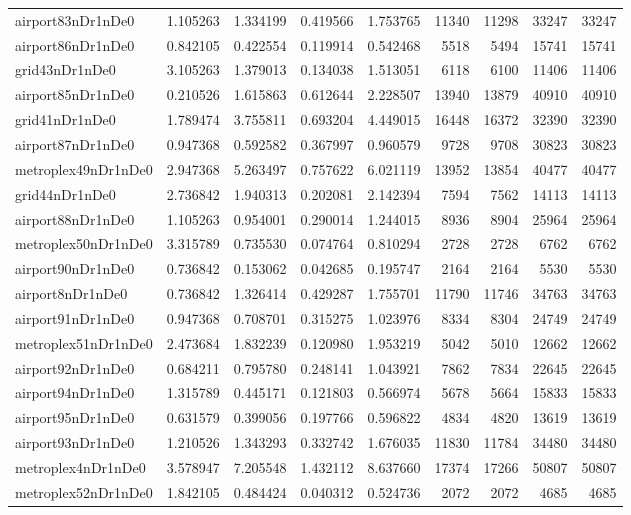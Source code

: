 \begin{longtable}{|l|r|r|r|r|r|r|r|r|}
airport83nDr1nDe0 & 1.105263 & 1.334199 & 0.419566 & 1.753765 & 11340 & 11298 & 33247 & 33247 \\
airport86nDr1nDe0 & 0.842105 & 0.422554 & 0.119914 & 0.542468 & 5518 & 5494 & 15741 & 15741 \\
grid43nDr1nDe0 & 3.105263 & 1.379013 & 0.134038 & 1.513051 & 6118 & 6100 & 11406 & 11406 \\
airport85nDr1nDe0 & 0.210526 & 1.615863 & 0.612644 & 2.228507 & 13940 & 13879 & 40910 & 40910 \\
grid41nDr1nDe0 & 1.789474 & 3.755811 & 0.693204 & 4.449015 & 16448 & 16372 & 32390 & 32390 \\
airport87nDr1nDe0 & 0.947368 & 0.592582 & 0.367997 & 0.960579 & 9728 & 9708 & 30823 & 30823 \\
metroplex49nDr1nDe0 & 2.947368 & 5.263497 & 0.757622 & 6.021119 & 13952 & 13854 & 40477 & 40477 \\
grid44nDr1nDe0 & 2.736842 & 1.940313 & 0.202081 & 2.142394 & 7594 & 7562 & 14113 & 14113 \\
airport88nDr1nDe0 & 1.105263 & 0.954001 & 0.290014 & 1.244015 & 8936 & 8904 & 25964 & 25964 \\
metroplex50nDr1nDe0 & 3.315789 & 0.735530 & 0.074764 & 0.810294 & 2728 & 2728 & 6762 & 6762 \\
airport90nDr1nDe0 & 0.736842 & 0.153062 & 0.042685 & 0.195747 & 2164 & 2164 & 5530 & 5530 \\
airport8nDr1nDe0 & 0.736842 & 1.326414 & 0.429287 & 1.755701 & 11790 & 11746 & 34763 & 34763 \\
airport91nDr1nDe0 & 0.947368 & 0.708701 & 0.315275 & 1.023976 & 8334 & 8304 & 24749 & 24749 \\
metroplex51nDr1nDe0 & 2.473684 & 1.832239 & 0.120980 & 1.953219 & 5042 & 5010 & 12662 & 12662 \\
airport92nDr1nDe0 & 0.684211 & 0.795780 & 0.248141 & 1.043921 & 7862 & 7834 & 22645 & 22645 \\
airport94nDr1nDe0 & 1.315789 & 0.445171 & 0.121803 & 0.566974 & 5678 & 5664 & 15833 & 15833 \\
airport95nDr1nDe0 & 0.631579 & 0.399056 & 0.197766 & 0.596822 & 4834 & 4820 & 13619 & 13619 \\
airport93nDr1nDe0 & 1.210526 & 1.343293 & 0.332742 & 1.676035 & 11830 & 11784 & 34480 & 34480 \\
metroplex4nDr1nDe0 & 3.578947 & 7.205548 & 1.432112 & 8.637660 & 17374 & 17266 & 50807 & 50807 \\
metroplex52nDr1nDe0 & 1.842105 & 0.484424 & 0.040312 & 0.524736 & 2072 & 2072 & 4685 & 4685 \\

\end{longtable}
